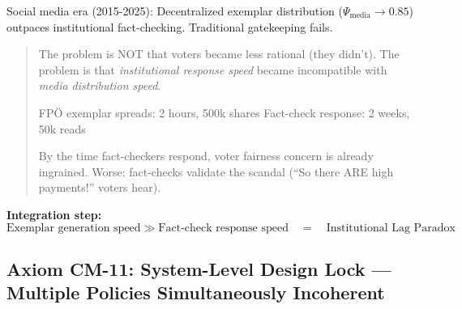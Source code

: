 Social media era (2015-2025): Decentralized exemplar distribution ($\Psi_{\text{media}} \rightarrow 0.85$) outpaces
institutional fact-checking. Traditional gatekeeping fails.

\begin{quote}
The problem is NOT that voters became less rational (they didn't). The problem is that
\textit{institutional response speed} became incompatible with \textit{media distribution speed}.

FPÖ exemplar spreads: 2 hours, 500k shares
Fact-check response: 2 weeks, 50k reads

By the time fact-checkers respond, voter fairness concern is already ingrained. Worse: fact-checks
validate the scandal (``So there ARE high payments!'' voters hear).
\end{quote}

\textbf{Integration step:}
\begin{equation}
\text{Exemplar generation speed} \gg \text{Fact-check response speed} \quad = \quad \text{Institutional Lag Paradox}
\end{equation}

\subsection{Axiom CM-11: System-Level Design Lock --- Multiple Policies Simultaneously Incoherent}

